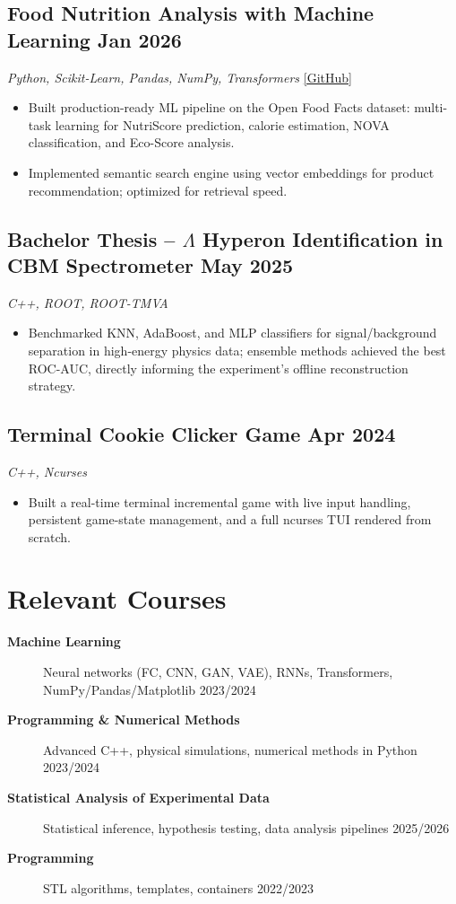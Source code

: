 \documentclass[11pt]{article}
\begin{document}
\subsection{Food Nutrition Analysis with Machine Learning \hfill Jan 2026}
\textit{Python, Scikit-Learn, Pandas, NumPy, Transformers} \quad \href{https://github.com/illyayurchanka/nutritions}{\small[GitHub]}
\begin{itemize}
    \item Built production-ready ML pipeline on the Open Food Facts dataset: multi-task learning for NutriScore prediction, calorie estimation, NOVA classification, and Eco-Score analysis.
    \item Implemented semantic search engine using vector embeddings for product recommendation; optimized for retrieval speed.
\end{itemize}

\subsection{Bachelor Thesis -- $\Lambda$ Hyperon Identification in CBM Spectrometer \hfill May 2025}
\textit{C++, ROOT, ROOT-TMVA}
\begin{itemize}
    \item Benchmarked KNN, AdaBoost, and MLP classifiers for signal/background separation in high-energy physics data; ensemble methods achieved the best ROC-AUC, directly informing the experiment's offline reconstruction strategy.
\end{itemize}

\subsection{Terminal Cookie Clicker Game \hfill Apr 2024}
\textit{C++, Ncurses}
\begin{itemize}
    \item Built a real-time terminal incremental game with live input handling, persistent game-state management, and a full ncurses TUI rendered from scratch.
\end{itemize}

\section{Relevant Courses}
\begin{description}
    \item[\textbf{Machine Learning}] Neural networks (FC, CNN, GAN, VAE), RNNs, Transformers, NumPy/Pandas/Matplotlib \hfill 2023/2024
    \item[\textbf{Programming \& Numerical Methods}] Advanced C++, physical simulations, numerical methods in Python \hfill 2023/2024
    \item[\textbf{Statistical Analysis of Experimental Data}] Statistical inference, hypothesis testing, data analysis pipelines \hfill 2025/2026
    \item[\textbf{Programming}] STL algorithms, templates, containers \hfill 2022/2023
\end{description}
\end{document}
